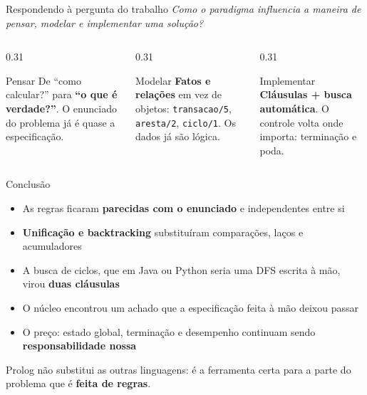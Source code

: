 \documentclass[aspectratio=169,11pt,xcolor=table]{beamer}
\newcommand{\destaque}[1]{%
  \begin{center}\colorbox{accent!10}{\parbox{0.92\linewidth}{\centering\strut #1\strut}}\end{center}}
\begin{document}
\begin{frame}{Respondendo à pergunta do trabalho}
  \centering
  {\small\emph{Como o paradigma influencia a maneira de pensar, modelar e
  implementar uma solução?}}
  \vspace{10pt}

  \begin{columns}[T]
    \begin{column}{0.31\textwidth}
      \begin{alertblock}{Pensar}
        \small De ``como calcular?'' para \textbf{``o que é verdade?''}. O
        enunciado do problema já é quase a especificação.
      \end{alertblock}
    \end{column}
    \begin{column}{0.31\textwidth}
      \begin{alertblock}{Modelar}
        \small \textbf{Fatos e relações} em vez de objetos:
        \texttt{transacao/5}, \texttt{aresta/2}, \texttt{ciclo/1}. Os dados já
        são lógica.
      \end{alertblock}
    \end{column}
    \begin{column}{0.31\textwidth}
      \begin{alertblock}{Implementar}
        \small \textbf{Cláusulas + busca automática}. O controle volta onde
        importa: terminação e poda.
      \end{alertblock}
    \end{column}
  \end{columns}
\end{frame}

\begin{frame}{Conclusão}
  \begin{itemize}
    \setlength{\itemsep}{7pt}
    \item As regras ficaram \textbf{parecidas com o enunciado} e independentes entre si
    \item \textbf{Unificação e backtracking} substituíram comparações, laços e acumuladores
    \item A busca de ciclos, que em Java ou Python seria uma DFS escrita à mão,
          virou \textbf{duas cláusulas}
    \item O núcleo encontrou um achado que a especificação feita à mão deixou passar
    \item O preço: estado global, terminação e desempenho continuam sendo
          \textbf{responsabilidade nossa}
  \end{itemize}
  \vspace{10pt}
  \destaque{Prolog não substitui as outras linguagens: é a ferramenta certa para
  a parte do problema que é \textbf{feita de regras}.}
\end{frame}
\end{document}
